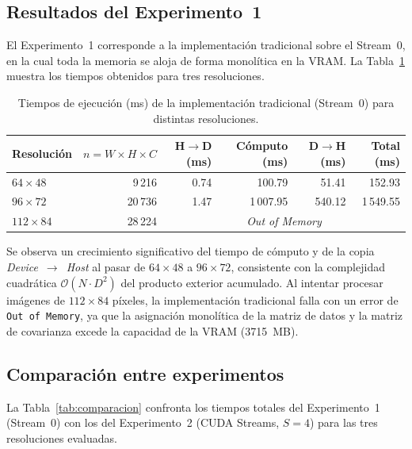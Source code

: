 \documentclass[12pt, a4paper]{article}
\begin{document}
\subsection{Resultados del Experimento~1}

El Experimento~1 corresponde a la implementación tradicional sobre el Stream~0,
en la cual toda la memoria se aloja de forma monolítica en la VRAM.
La Tabla~\ref{tab:exp1} muestra los tiempos obtenidos para tres resoluciones.

\begin{table}[H]
    \centering
    \caption{Tiempos de ejecución (ms) de la implementación tradicional
             (Stream~0) para distintas resoluciones.}
    \label{tab:exp1}
    \begin{tabular}{@{} l r r r r r @{}}
        \toprule
        \textbf{Resolución} &
        \textbf{$n = W{\times}H{\times}C$} &
        \textbf{H$\to$D (ms)} &
        \textbf{Cómputo (ms)} &
        \textbf{D$\to$H (ms)} &
        \textbf{Total (ms)} \\
        \midrule
        $64 \times 48$   & 9\,216  & 0.74   & 100.79   & 51.41  & 152.93   \\
        $96 \times 72$   & 20\,736 & 1.47   & 1\,007.95 & 540.12 & 1\,549.55 \\
        $112 \times 84$  & 28\,224 & \multicolumn{4}{c}{\textit{Out of Memory}} \\
        \bottomrule
    \end{tabular}
\end{table}

Se observa un crecimiento significativo del tiempo de cómputo y de la copia
\textit{Device}~$\to$~\textit{Host} al pasar de $64 \times 48$ a
$96 \times 72$, consistente con la complejidad cuadrática
$\mathcal{O}(N \cdot D^2)$ del producto exterior acumulado. Al intentar
procesar imágenes de $112 \times 84$ píxeles, la implementación tradicional
falla con un error de \texttt{Out of Memory}, ya que la asignación monolítica
de la matriz de datos y la matriz de covarianza excede la capacidad de la VRAM
(3715~MB).

\subsection{Comparación entre experimentos}

La Tabla~\ref{tab:comparacion} confronta los tiempos totales del Experimento~1
(Stream~0) con los del Experimento~2 (CUDA Streams, $S = 4$) para las tres
resoluciones evaluadas.
\end{document}
